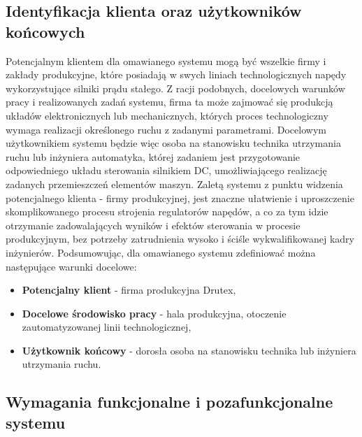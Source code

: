 \subsection{Identyfikacja klienta oraz użytkowników końcowych}
\indent Potencjalnym klientem dla omawianego systemu mogą być wszelkie firmy i zakłady produkcyjne, które posiadają w swych liniach technologicznych napędy wykorzystujące silniki prądu stałego. Z racji podobnych, docelowych warunków pracy i realizowanych zadań systemu, firma ta może zajmować się produkcją układów elektronicznych lub mechanicznych, których proces technologiczny wymaga realizacji określonego ruchu z zadanymi parametrami.\newline
\indent Docelowym użytkownikiem systemu będzie więc osoba na stanowisku technika utrzymania ruchu lub inżyniera automatyka, której zadaniem jest przygotowanie odpowiedniego układu sterowania silnikiem DC, umożliwiającego realizację zadanych przemieszczeń elementów maszyn. \newline
\indent Zaletą systemu z punktu widzenia potencjalnego klienta - firmy produkcyjnej, jest znaczne ułatwienie i uproszczenie skomplikowanego procesu strojenia regulatorów napędów, a co za tym idzie otrzymanie zadowalających wyników i efektów sterowania w procesie produkcyjnym, bez potrzeby zatrudnienia wysoko i ściśle wykwalifikowanej kadry inżynierów.\newline
\indent Podsumowując, dla omawianego systemu zdefiniować można następujące warunki docelowe:
\begin{itemize}
\item \textbf{Potencjalny klient} - firma produkcyjna Drutex,
\item \textbf{Docelowe środowisko pracy} - hala produkcyjna, otoczenie zautomatyzowanej linii technologicznej,
\item \textbf{Użytkownik końcowy} - dorosła osoba na stanowisku technika lub inżyniera utrzymania ruchu.
\end{itemize}
\newpage
\subsection{Wymagania funkcjonalne i pozafunkcjonalne systemu}


